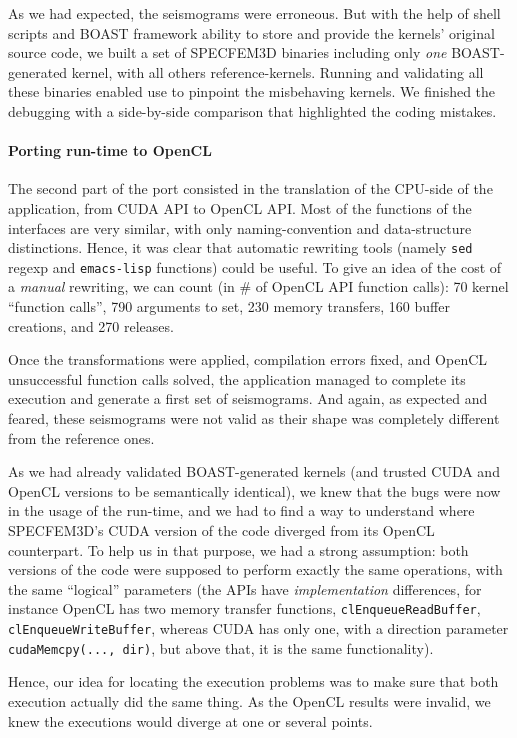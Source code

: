 \documentclass{IEEEtran}
\newcommand{\code}[1]{\texttt{#1}}
\begin{document}
As we had expected, the seismograms were erroneous. But with the help
of shell scripts and BOAST framework ability to store and provide the
kernels' original source code, we built a set of SPECFEM3D binaries
including only \emph{one} BOAST-generated kernel, with all others
reference-kernels. Running and validating all these binaries enabled
use to pinpoint the misbehaving kernels. We finished the debugging
with a side-by-side comparison that highlighted the coding mistakes.

\paragraph{Porting run-time to OpenCL} The second part of the port
consisted in the translation of the CPU-side of the application, from
CUDA API to OpenCL API. Most of the functions of the interfaces are
very similar, with only naming-convention and data-structure
distinctions. Hence, it was clear that automatic rewriting tools
(namely \code{sed} regexp and \code{emacs-lisp} functions) could be
useful. To give an idea of the cost of a \emph{manual} rewriting, we
can count (in \# of OpenCL API function calls): 70 kernel ``function
calls'', 790 arguments to set, 230 memory transfers, 160 buffer
creations, and 270 releases.

Once the transformations were applied,
compilation errors fixed, and OpenCL unsuccessful function calls solved,
the application managed to complete its execution and generate a first
set of seismograms. And again, as expected and feared, these
seismograms were not valid as their shape was completely different from the
reference ones.

As we had already validated BOAST-generated kernels (and trusted CUDA and OpenCL
versions to be semantically identical), we knew that the bugs were now in the
usage of the run-time, and we had to find a way to understand where SPECFEM3D's
CUDA version of the code diverged from its OpenCL counterpart. To help us in
that purpose, we had a strong assumption: both versions of the code were
supposed to perform exactly the same operations, with the same ``logical''
parameters (the APIs have \emph{implementation} differences, for instance OpenCL
has two memory transfer functions, \code{clEnqueueReadBuffer},
\code{clEnqueueWriteBuffer}, whereas CUDA has only one, with a direction
parameter \code{cudaMemcpy(..., dir)}, but above that, it is the same
functionality).

Hence, our idea for locating the execution problems was to make sure
that both execution actually did the same thing. As the OpenCL results
were invalid, we knew the executions would diverge at one or several
points.
\end{document}
